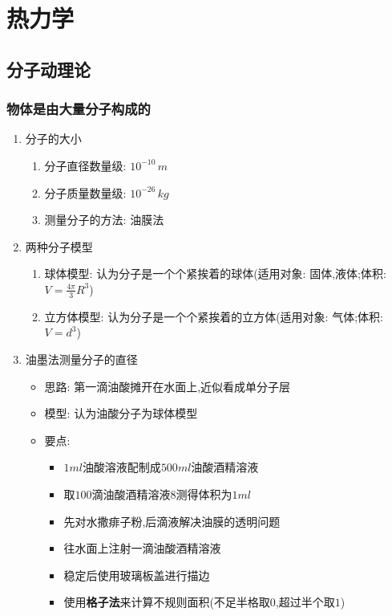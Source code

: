\documentclass{article}
\begin{document}
\vspace{2em}

\section{热力学}
\subsection{分子动理论}
\subsubsection{物体是由大量分子构成的}
\begin{enumerate}
    \item 分子的大小
          \begin{enumerate}[label = (\arabic*{})]
              \item 分子直径数量级: $10^{-10} \, m$
              \item 分子质量数量级: $10^{-26} \, kg$
              \item 测量分子的方法: 油膜法
          \end{enumerate}

          \vspace{2em}

    \item 两种分子模型
          \begin{enumerate}[label = (\arabic*{})]
              \item 球体模型: 认为分子是一个个紧挨着的球体(适用对象: 固体,液体;体积:$V = \frac{4\pi}{3} R^{3}$)
              \item 立方体模型: 认为分子是一个个紧挨着的立方体(适用对象: 气体;体积:$V = d^{3}$)
          \end{enumerate}

          \vspace{2em}

    \item 油墨法测量分子的直径
          \begin{itemize}
              \item 思路: 第一滴油酸摊开在水面上,近似看成单分子层
              \item 模型: 认为油酸分子为球体模型
              \item 要点:
                    \begin{itemize}
                        \item $1ml$油酸溶液配制成$500ml$油酸酒精溶液
                        \item 取$100$滴油酸酒精溶液8测得体积为$1ml$
                        \item 先对水撒痱子粉,后滴液解决油膜的透明问题
                        \item 往水面上注射一滴油酸酒精溶液
                        \item 稳定后使用玻璃板盖进行描边
                        \item 使用\textbf{格子法}来计算不规则面积(不足半格取$0$,超过半个取$1$)
                    \end{itemize}
          \end{itemize}


\end{enumerate}
\end{document}
